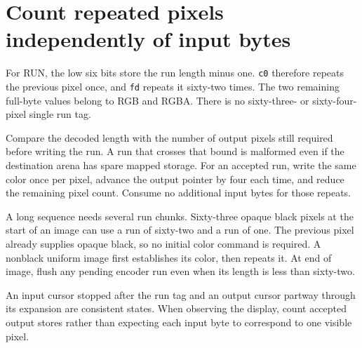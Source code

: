 \section{Count repeated pixels independently of input bytes}
For RUN, the low six bits store the run length minus one. \texttt{c0} therefore repeats
the previous pixel once, and \texttt{fd} repeats it sixty-two times. The two remaining
full-byte values belong to RGB and RGBA. There is no sixty-three- or sixty-four-pixel
single run tag.

Compare the decoded length with the number of output pixels still required before
writing the run. A run that crosses that bound is malformed even if the destination
arena has spare mapped storage. For an accepted run, write the same color once per
pixel, advance the output pointer by four each time, and reduce the remaining pixel
count. Consume no additional input bytes for those repeats.

A long sequence needs several run chunks. Sixty-three opaque black pixels at the
start of an image can use a run of sixty-two and a run of one. The previous pixel
already supplies opaque black, so no initial color command is required. A nonblack
uniform image first establishes its color, then repeats it. At end of image, flush
any pending encoder run even when its length is less than sixty-two.

An input cursor stopped after the run tag and an output cursor partway through its
expansion are consistent states. When observing the display, count accepted output
stores rather than expecting each input byte to correspond to one visible pixel.
